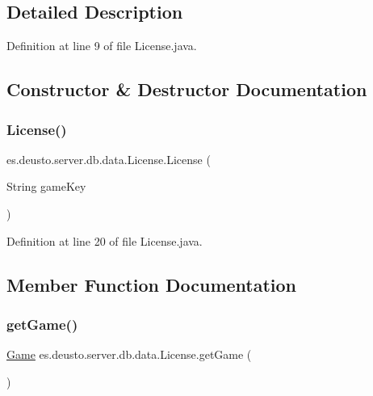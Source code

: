 \subsection{Detailed Description}


Definition at line 9 of file License.\+java.



\subsection{Constructor \& Destructor Documentation}
\mbox{\label{classes_1_1deusto_1_1server_1_1db_1_1data_1_1_license_acc02ae536a7b91b4055271fc93ca8957}} 
\subsubsection{\texorpdfstring{License()}{License()}}
{\footnotesize\ttfamily es.\+deusto.\+server.\+db.\+data.\+License.\+License (\begin{DoxyParamCaption}\item[{String}]{game\+Key }\end{DoxyParamCaption})}



Definition at line 20 of file License.\+java.



\subsection{Member Function Documentation}
\mbox{\label{classes_1_1deusto_1_1server_1_1db_1_1data_1_1_license_a38c4c66098bc5faa947cd6599fc7f90f}} 
\subsubsection{\texorpdfstring{get\+Game()}{getGame()}}
{\footnotesize\ttfamily \hyperlink{classes_1_1deusto_1_1server_1_1db_1_1data_1_1_game}{Game} es.\+deusto.\+server.\+db.\+data.\+License.\+get\+Game (\begin{DoxyParamCaption}{ }\end{DoxyParamCaption})}



